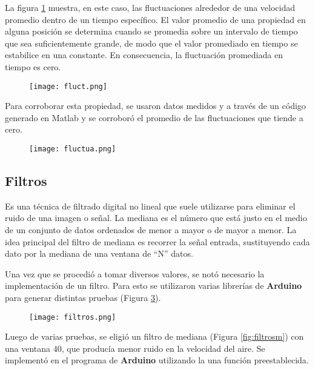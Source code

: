 La figura \ref{fig:fluct} muestra, en este caso, las fluctuaciones alrededor de una velocidad promedio dentro de un tiempo específico. El valor promedio de una propiedad en alguna posición se determina cuando se promedia sobre un intervalo de tiempo que sea suficientemente grande, de modo que el valor promediado en tiempo se estabilice en una constante. En consecuencia, la fluctuación promediada en tiempo es cero.

\begin{figure}[htb]
	\centering
	\texttt{[image: fluct.png]}
	\label{fig:fluct}
\end{figure}

Para corroborar esta propiedad, se usaron datos medidos y a través de un código generado en Matlab y se corroboró el promedio de las fluctuaciones que tiende a cero.
\begin{figure}[h!tb]
	\centering
	\texttt{[image: fluctua.png]}
	\label{fig:fluct2}
\end{figure}



\subsection{Filtros}
\begin{tcolorbox}[colback=blue!5!white,colframe=blue!75!black,title=Mediana]
	Es una técnica de filtrado digital no lineal que suele utilizarse para eliminar el ruido de una imagen o señal. La mediana es el número que está justo en el medio de un conjunto de datos ordenados de menor a mayor o de mayor a menor.
	La idea principal del filtro de mediana es recorrer la señal entrada, sustituyendo cada dato por la mediana de una ventana de “N” datos.
\end{tcolorbox}

Una vez que se procedió a tomar diversos valores, se notó necesario la implementación de un filtro. Para esto se utilizaron varias librerías de \textbf{Arduino} para generar distintas pruebas (Figura \ref{fig:filtros}).

\begin{figure}[!h]
	\centering
	\texttt{[image: filtros.png]}
	\label{fig:filtros}
\end{figure}

Luego de varias pruebas, se eligió un filtro de mediana (Figura \ref{fig:filtrosm}) con una ventana 40, que producía menor ruido en la velocidad del aire. Se implementó en el programa de \textbf{Arduino} utilizando la una función preestablecida.

